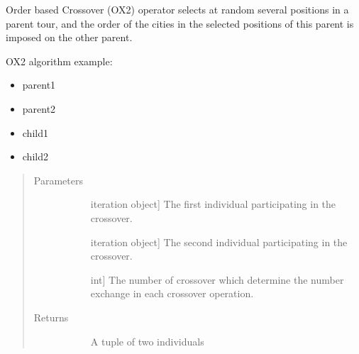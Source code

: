 \documentclass[letterpaper,10pt,english]{sphinxmanual}
\begin{document}
\begin{fulllineitems}
\label{\detokenize{pygace:pygace.ga.order_based_crossover}}
Order based Crossover (OX2) operator selects at random several positions
in a parent tour, and the order of the cities in the selected positions
of this parent is imposed on the other parent.

OX2 algorithm example:
\begin{itemize}
\item {} 
parent1 

\item {} 
parent2 

\item {} 
child1 

\item {} 
child2 

\end{itemize}
\begin{quote}\begin{description}
\item[{Parameters}] \leavevmode\begin{description}
\item[{}] \leavevmode{[}iteration object{]}
The first individual participating in the crossover.

\item[{}] \leavevmode{[}iteration object{]}
The second individual participating in the crossover.

\item[{}] \leavevmode{[}int{]}
The number of crossover which determine the number exchange in each
crossover operation.

\end{description}

\item[{Returns}] \leavevmode\begin{description}
\item[{}] \leavevmode
A tuple of two individuals


\end{description}
\end{description}
\end{quote}
\end{fulllineitems}
\end{document}

